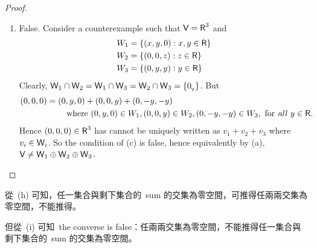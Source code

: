 \begin{proof}
\begin{enumerate}
\item False.
Consider a counterexample such that \(\textsf{V} = \textsf{R}^3\) and
\begin{align*}
    W_1 & = \{ (x, y, 0) : x, y \in \textsf{R} \} \\
    W_2 & = \{ (0, 0, z) : z \in \textsf{R} \} \\
    W_3 & = \{ (0, y, y) : y \in \textsf{R} \}
\end{align*}
Clearly, \(\textsf{W}_1 \cap \textsf{W}_2 = \textsf{W}_1 \cap \textsf{W}_3 = \textsf{W}_2 \cap \textsf{W}_3 = \{ 0_{_{\textsf{V}}} \}\).
But
\begin{align*}
    (0, 0, 0) & = (0, y, 0) + (0, 0, y) + (0, -y, -y) \\
    & \quad \quad \text{ where } (0, y, 0) \in W_1, (0, 0, y) \in W_2, (0, -y, -y) \in W_3, \text{ for \emph{all} } y \in \textsf{R}.
\end{align*}
Hence \((0, 0, 0) \in \textsf{R}^3\) has cannot be uniquely written as \(v_1 + v_2 + v_3\) where \(v_i \in \textsf{W}_i\).
So the condition of (c) is false, hence equivalently by (a), \(\textsf{V} \ne \textsf{W}_1 \oplus \textsf{W}_2 \oplus \textsf{W}_3\).
\end{enumerate}
\end{proof}

\begin{note}
從\ (h) 可知，任一集合與剩下集合的\ sum 的交集為零空間，可推得任兩兩交集為零空間，不能推得。

但從\ (i) 可知\ the converse is false：任兩兩交集為零空間，不能推得任一集合與剩下集合的\ sum 的交集為零空間。
\end{note}

